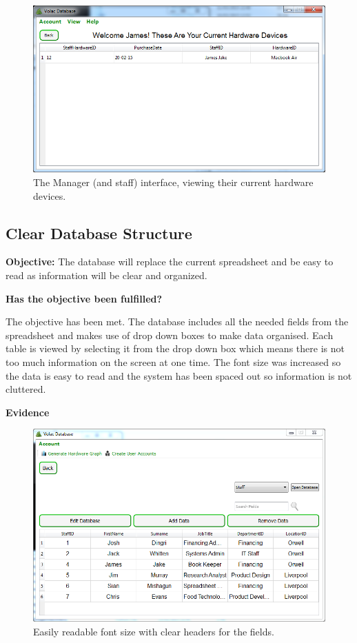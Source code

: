 \begin{figure}[H]
    \includegraphics[width=\textwidth]{./Evaluation/Images/database2.png}
    \caption{The Manager (and staff) interface, viewing their current hardware devices.} \label{fig:db3}
\end{figure}

\subsection{Clear Database Structure}

\textbf{Objective:} The database will replace the current spreadsheet and be easy to read as information will be clear and organized.

\textbf{Has the objective been fulfilled?}

The objective has been met. The database includes all the needed fields from the spreadsheet and makes use of drop down boxes to make data organised. Each table is viewed by selecting it from the drop down box which means there is not too much information on the screen at one time. The font size was increased so the data is easy to read and the system has been spaced out so information is not cluttered.

\textbf{Evidence}

\begin{figure}[H]
    \includegraphics[width=\textwidth]{./Evaluation/Images/cleardb1.png}
    \caption{Easily readable font size with clear headers for the fields.}
\end{figure}

